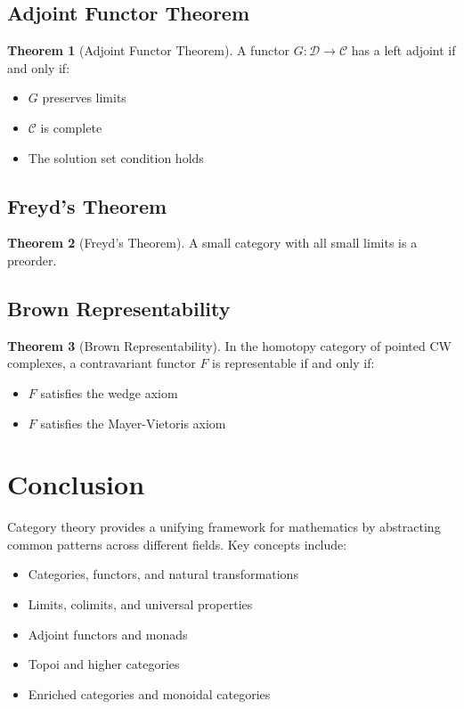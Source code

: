\documentclass[11pt]{article}
\theoremstyle{definition}
\newtheorem{theorem}{Theorem}[section]
\begin{document}
\subsection{Adjoint Functor Theorem}
\begin{theorem}[Adjoint Functor Theorem]
A functor $G: \mathcal{D} \to \mathcal{C}$ has a left adjoint if and only if:
\begin{itemize}
    \item $G$ preserves limits
    \item $\mathcal{C}$ is complete
    \item The solution set condition holds
\end{itemize}
\end{theorem}

\subsection{Freyd's Theorem}
\begin{theorem}[Freyd's Theorem]
A small category with all small limits is a preorder.
\end{theorem}

\subsection{Brown Representability}
\begin{theorem}[Brown Representability]
In the homotopy category of pointed CW complexes, a contravariant functor $F$ is representable if and only if:
\begin{itemize}
    \item $F$ satisfies the wedge axiom
    \item $F$ satisfies the Mayer-Vietoris axiom
\end{itemize}
\end{theorem}

\section{Conclusion}

Category theory provides a unifying framework for mathematics by abstracting common patterns across different fields. Key concepts include:

\begin{itemize}
    \item Categories, functors, and natural transformations
    \item Limits, colimits, and universal properties
    \item Adjoint functors and monads
    \item Topoi and higher categories
    \item Enriched categories and monoidal categories
\end{itemize}
\end{document}
